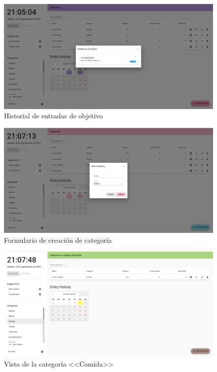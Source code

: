 \documentclass[10pt, a4paper]{aqademic}
\begin{document}
\begin{figure}[hbt!]
	\centering
	\includegraphics[scale=0.25]{img/demo-historial-1.png}
	\caption{Historial de entradas de objetivo}
\end{figure}

\begin{figure}[hbt!]
	\centering
	\includegraphics[scale=0.25]{img/demo-category-1.png}
	\caption{Formulario de creación de categoría}
\end{figure}

\begin{figure}[hbt!]
	\centering
	\includegraphics[scale=0.25]{img/demo-catfilter-1.png}
	\caption{Vista de la categoría <<Comida>>}
\end{figure}
\end{document}
